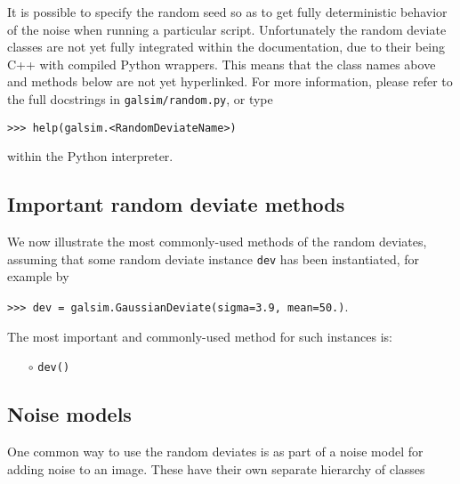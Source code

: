 \documentclass[preprint,11pt]{../../devel/modules/aastex}
\begin{document}
It is possible to specify the random seed so as to get fully
deterministic behavior of the noise when running a particular script.
Unfortunately the random deviate classes are not yet fully integrated
within the documentation, due to their being C++ with compiled Python
wrappers.  This means that the class names above and methods below are
not yet hyperlinked.  For more information, please refer to the full docstrings in
\texttt{galsim/random.py}, 
or type

{\tt >>> help(galsim.<RandomDeviateName>)}

within the Python interpreter.

\subsection{Important random deviate methods}\label{sect:randommethods}
We now illustrate the most commonly-used methods of the random
deviates, assuming that some random deviate instance \texttt{dev} has
been instantiated, for example by

{\tt >>> dev = galsim.GaussianDeviate(sigma=3.9, mean=50.)}.

The most important and commonly-used method for such
instances is:
\begin{itemize}

\item[$\circ$] \texttt{dev()} 

\end{itemize}

\subsection{Noise models}\label{sect:noisemodels}

One common way to use the random deviates is as part of a noise model for adding 
noise to an image.  These have their own separate hierarchy of classes
\end{document}
